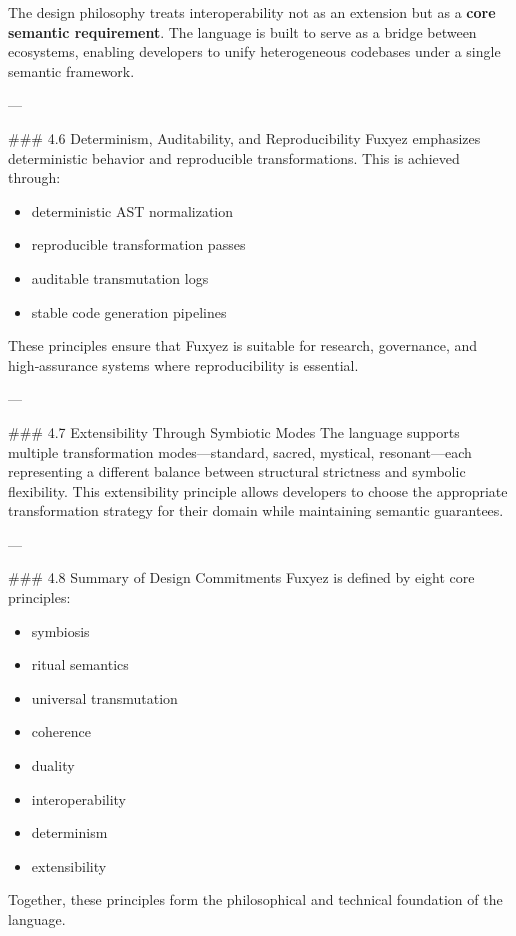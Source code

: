 The design philosophy treats interoperability not as an extension but as a \textbf{core semantic requirement}. The language is built to serve as a bridge between ecosystems, enabling developers to unify heterogeneous codebases under a single semantic framework.

---

\#\#\# 4.6 Determinism, Auditability, and Reproducibility  
Fuxyez emphasizes deterministic behavior and reproducible transformations. This is achieved through:

\begin{itemize}
  \item deterministic AST normalization  
  \item reproducible transformation passes  
  \item auditable transmutation logs  
  \item stable code generation pipelines  
\end{itemize}

These principles ensure that Fuxyez is suitable for research, governance, and high‑assurance systems where reproducibility is essential.

---

\#\#\# 4.7 Extensibility Through Symbiotic Modes  
The language supports multiple transformation modes—standard, sacred, mystical, resonant—each representing a different balance between structural strictness and symbolic flexibility. This extensibility principle allows developers to choose the appropriate transformation strategy for their domain while maintaining semantic guarantees.

---

\#\#\# 4.8 Summary of Design Commitments  
Fuxyez is defined by eight core principles:

\begin{itemize}
  \item symbiosis  
  \item ritual semantics  
  \item universal transmutation  
  \item coherence  
  \item duality  
  \item interoperability  
  \item determinism  
  \item extensibility  
\end{itemize}

Together, these principles form the philosophical and technical foundation of the language.
    
